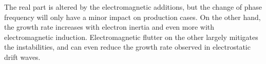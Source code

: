 The real part is altered by the electromagnetic additions, but the change of phase frequency will only have a minor impact on production cases. On the other hand, the growth rate increases with electron inertia and even more with electromagnetic induction. Electromagnetic flutter on the other largely mitigates the instabilities, and can even reduce the growth rate observed in electrostatic drift waves.



